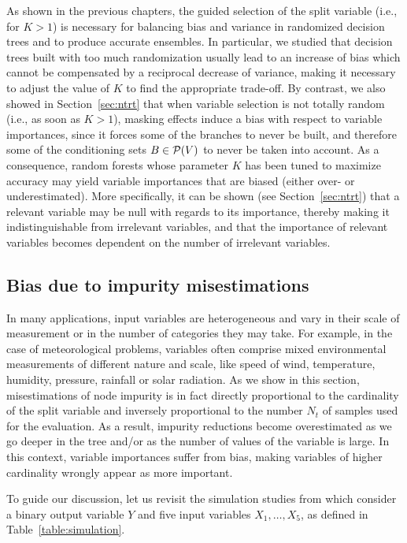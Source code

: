 As shown in the previous chapters, the guided selection of the split variable
(i.e., for $K>1$) is necessary for balancing bias and variance in  randomized
decision trees and to produce accurate ensembles. In particular, we studied
that decision trees built with too much randomization usually lead to an
increase of bias which cannot be compensated by a reciprocal decrease of
variance, making it necessary to adjust the value of $K$ to find the
appropriate trade-off. By contrast, we also showed in Section~\ref{sec:ntrt}
that when variable selection is not totally random (i.e., as soon as $K>1$),
masking effects induce a bias with respect to variable importances, since it
forces some of the branches to never be built, and therefore some of the
conditioning sets $B \in {\cal P}(V)$ to never be taken into account. As a
consequence, random forests whose parameter $K$ has been tuned to maximize
accuracy may yield variable importances that are biased (either
over- or underestimated). More specifically, it can be shown (see
Section~\ref{sec:ntrt}) that a relevant variable may be null with regards to
its importance, thereby making it indistinguishable from irrelevant variables,
and that the importance of relevant variables becomes dependent on the number
of irrelevant variables.


\subsection{Bias due to impurity misestimations}
\label{sec:7:bias:high}

In many applications, input variables are heterogeneous and vary in their scale
of measurement or in the number of categories they may take. For example, in
the case of meteorological problems, variables often comprise mixed
environmental measurements of different nature and scale,   like speed of
wind, temperature, humidity, pressure, rainfall or solar radiation. As we show
in this section, misestimations of node impurity is in fact directly
proportional to the cardinality of the split variable and inversely
proportional to the number $N_t$ of samples used for the evaluation. As a
result, impurity reductions become overestimated as we go deeper in the tree
and/or as the number of values of the variable is large. In this context,
variable importances suffer from bias, making variables of higher cardinality
wrongly appear as more important.

To guide our discussion, let us revisit the simulation studies from
\citep{strobl:2007b} which consider a binary output variable $Y$ and five
input variables $X_1,\dots,X_5$, as defined in Table~\ref{table:simulation}.

